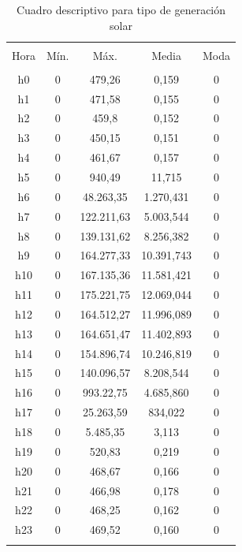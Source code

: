 \documentclass[conference, 10pt]{IEEEtran}
\begin{document}
\begin{table}[!htbp] \centering 
  \caption{Cuadro descriptivo para tipo de generación solar} 
  \begin{tabular}{@{\extracolsep{5pt}} ccccc} 
\\[-1.8ex]\hline 
\hline \\[-1.8ex] 
Hora & Mín. & Máx. & Media & Moda \\ 
\hline \\[-1.8ex] 
h0 & 0 & 479,26 & 0,159& 0 \\ 
h1 & 0 & 471,58 & 0,155& 0 \\ 
h2 & 0 & 459,8 & 0,152& 0 \\ 
h3 & 0 & 450,15 & 0,151& 0 \\ 
h4 & 0 & 461,67 & 0,157& 0 \\ 
h5 & 0 & 940,49 & 11,715 & 0 \\ 
h6 & 0 & 48.263,35 & 1.270,431& 0 \\ 
h7 & 0 & 122.211,63 & 5.003,544& 0 \\ 
h8 & 0 & 139.131,62 & 8.256,382& 0 \\ 
h9 & 0 & 164.277,33 & 10.391,743& 0 \\ 
h10 & 0 & 167.135,36 & 11.581,421& 0 \\ 
h11 & 0 & 175.221,75 & 12.069,044& 0 \\ 
h12 & 0 & 164.512,27 & 11.996,089& 0 \\ 
h13 & 0 & 164.651,47 & 11.402,893& 0 \\ 
h14 & 0 & 154.896,74 & 10.246,819& 0 \\ 
h15 & 0 & 140.096,57 & 8.208,544& 0 \\ 
h16 & 0 & 993.22,75 & 4.685,860& 0 \\ 
h17 & 0 & 25.263,59 & 834,022& 0 \\ 
h18 & 0 & 5.485,35 & 3,113& 0 \\ 
h19 & 0 & 520,83 & 0,219& 0 \\ 
h20 & 0 & 468,67 & 0,166& 0 \\ 
h21 & 0 & 466,98 & 0,178& 0 \\ 
h22 & 0 & 468,25 & 0,162& 0 \\ 
h23 & 0 & 469,52 & 0,160& 0 \\ \hline \\[-1.8ex] 
\end{tabular} 
\label{tab_18}
\end{table}
\end{document}
